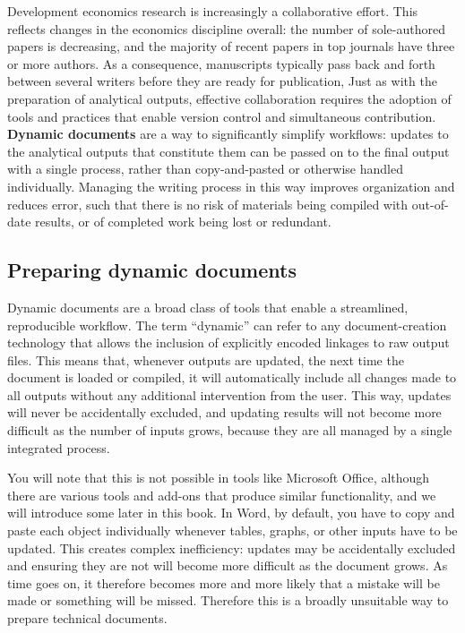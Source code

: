 Development economics research is increasingly a collaborative effort. 
This reflects changes in the economics discipline overall: 
the number of sole-authored papers is decreasing, 
and the majority of recent papers in top journals have three or more 
authors.
As a consequence, manuscripts typically pass back and forth between several writers
before they are ready for publication,
Just as with the preparation of analytical outputs,
effective collaboration requires the adoption of tools and practices 
that enable version control and simultaneous contribution.
\textbf{Dynamic documents} are a way to significantly simplify workflows:
updates to the analytical outputs that constitute them
can be passed on to the final output with a single process,
rather than copy-and-pasted or otherwise handled individually.
Managing the writing process in this way
improves organization and reduces error,
such that there is no risk of materials being compiled
with out-of-date results, or of completed work being lost or redundant.

\subsection{Preparing dynamic documents}

Dynamic documents are a broad class of tools that enable a streamlined, reproducible workflow.
The term ``dynamic'' can refer to any document-creation technology
that allows the inclusion of explicitly encoded linkages to raw output files.
This means that, whenever outputs are updated,
the next time the document is loaded or compiled, it will automatically include
all changes made to all outputs without any additional intervention from the user.
This way, updates will never be accidentally excluded,
and updating results will not become more difficult
as the number of inputs grows,
because they are all managed by a single integrated process.

You will note that this is not possible in tools like Microsoft Office,
although there are various tools and add-ons that produce similar functionality,
and we will introduce some later in this book.
In Word, by default, you have to copy and paste each object individually
whenever tables, graphs, or other inputs have to be updated.
This creates complex inefficiency: updates may be accidentally excluded
and ensuring they are not will become more difficult as the document grows.
As time goes on, it therefore becomes more and more likely
that a mistake will be made or something will be missed.
Therefore this is a broadly unsuitable way to prepare technical documents.

